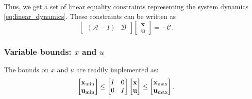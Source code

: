 \documentclass[a4paper,12pt,fleqn]{article}
\newcommand{\varxvec}{\mathbf{x}}
\newcommand{\varuvec}{\mathbf{u}}
\begin{document}
Thus, we get a set of linear equality constraints representing the system dynamics \eqref{eq:linear_dynamics}.
These constraints can be written as
\begin{equation}
 \begin{bmatrix}
  (\mathcal{A}-I) & \mathcal{B}
 \end{bmatrix}
 \begin{bmatrix}
  \varxvec\\
  \varuvec
 \end{bmatrix}
 = -\mathcal{C}.
\end{equation}
\subsubsection{Variable bounds: $x$ and $u$}
The bounds on $x$ and $u$ are readily implemented as:
\begin{equation}
\begin{bmatrix}
 \varxvec_{\rm min}\\\varuvec_{\rm min}
\end{bmatrix}
\leq
\begin{bmatrix}
 I &0\\
 0 & I
\end{bmatrix}
\begin{bmatrix}
 \varxvec\\ \varuvec
\end{bmatrix}
\leq
\begin{bmatrix}
 \varxvec_{\rm max}\\ \varuvec_{\rm max}
\end{bmatrix}.
\end{equation}
\end{document}
